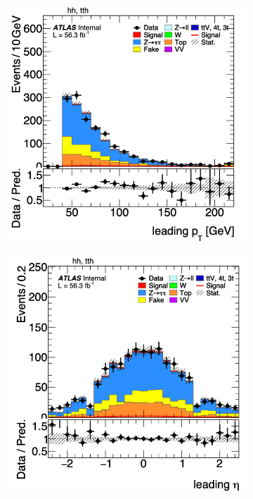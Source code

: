 \begin{figure}[htbp]
    \begin{subfigure}[b]{0.45\textwidth}
        \centering
        \includegraphics[width=\textwidth]{images/leading_pt_rnn.png}
        \caption{}
    \end{subfigure}
    \begin{subfigure}[b]{0.45\textwidth}
        \centering
        \includegraphics[width=\textwidth]{images/leading_eta_rnn.png}
        \caption{}
    \end{subfigure}


\end{figure}
